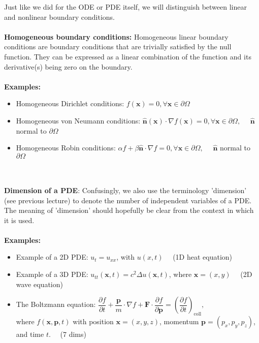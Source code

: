 Just like we did for the ODE or PDE itself, we will distinguish between linear and nonlinear boundary conditions. 
\\
\\
{\bf Homogeneous boundary conditions:} Homogeneous linear boundary conditions  are boundary conditions that are trivially satisfied by the null function. They can be expressed as a linear combination of the function and its derivative(s)  being zero on the boundary. 
\\
\\
{\bf Examples:}
\begin{itemize}
    \item Homogeneous Dirichlet conditions: 
    \color{red} $f(\mathbf{x}) = 0, 
    \forall \mathbf{x} \in \partial \Omega$ 
    \color{black}
    \item Homogeneous von Neumann conditions:
    \color{red}
    $\mathbf{\hat{n}} (\mathbf{x}) \cdot \nabla f (\mathbf{x})= 0, 
    \forall \mathbf{x} \in \partial \Omega, \quad$ 
    $\mathbf{\hat{n}}$ normal to $\partial \Omega$
    \color{black}
    \item Homogeneous Robin conditions: 
    \color{red}
    $\alpha f + \beta \mathbf{\hat{n}} \cdot \nabla f = 0, 
    \forall \mathbf{x} \in \partial \Omega, \quad$ 
    $\mathbf{\hat{n}}$ normal to $\partial \Omega$
\end{itemize}
\\
\\
{\bf Dimension of a PDE}: Confusingly, we also use the terminology 'dimension' (see previous lecture) to denote the number of independent variables of a PDE. The meaning of 'dimension' should hopefully be clear from the context in which it is used. 
\\
\\
{\bf Examples:}
\begin{itemize}
    \item Example of a 2D PDE: 
    \color{red}
    $u_{t} = u_{xx}$, with $u(x,t) \quad$ 
    (1D heat equation) 
    \color{black}
    \item Example of a  3D PDE: 
    \color{red}
    $u_{tt}(\mathbf{x},t) = c^{2} \Delta u(\mathbf{x},t)$, where $\mathbf{x} = (x,y) \quad$ 
    (2D wave equation)
    \color{black}
    \item The Boltzmann equation: 
    \color{red}
    $\dfrac{\partial f}{\partial t} 
    + \dfrac{\mathbf{p}}{m} \cdot \nabla f 
    + \mathbf{F} \cdot \dfrac{\partial f}{\partial \mathbf{p}} 
    = \left( \dfrac{\partial f}{\partial t} \right)_{\text{coll}}, $ \\
    where $f(\mathbf{x},\mathbf{p},t)$ 
    with position $\mathbf{x}=(x,y,z)$, momentum $\mathbf{p}=(p_{x}, p_{y}, p_{z})$, 
    and time $t. \quad$ (7 dims) 
    \color{black}
\end{itemize}
